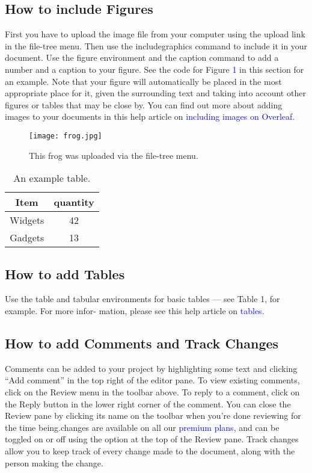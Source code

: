 \documentclass{article}
\begin{document}
{ \subsection{How to include Figures}
 First you have to upload the image file from your computer using the upload link in the file-tree menu.
 Then use the includegraphics command to include it in your document. Use the figure environment and the caption command to add a number and a caption to your figure. See the code for Figure \textcolor{blue}{1} in this section for an example.\newline
 Note that your figure will automatically be placed in the most appropriate place for it, given the surrounding text and taking into   
 account other figures or tables that may be close by. You can find out more about adding images to your documents in this help article on \textcolor{blue}{including images on Overleaf.}
  \begin{figure}
  	\centering
  	\texttt{[image: frog.jpg]}
  	\caption{This frog was uploaded via the file-tree menu.}
 \end{figure}
 \begin{table}
 	\centering
 	\begin{tabular}{c|c}
 		Item   &  quantity\\
 		\hline
 		Widgets & 42\\
 		Gadgets & 13
 	\end{tabular}
 	\caption{An example table.}
 	\label{tab:example}
 \end{table}
 \subsection{How to add Tables}
Use the table and tabular environments for basic tables — see Table 1, for example. For more infor-
mation, please see this help article on \textcolor{blue}{ tables.}
\subsection{How to add Comments and Track Changes}
Comments can be added to your project by highlighting some text and clicking “Add comment” in
the top right of the editor pane. To view existing comments, click on the Review menu in the toolbar
above. To reply to a comment, click on the Reply button in the lower right corner of the comment.
You can close the Review pane by clicking its name on the toolbar when you’re done reviewing for the
time being.\newline changes are available on all our \textcolor{blue}{premium plans}, and can be toggled on or off using the option
at the top of the Review pane. Track changes allow you to keep track of every change made to the
document, along with the person making the change.
}
\end{document}
